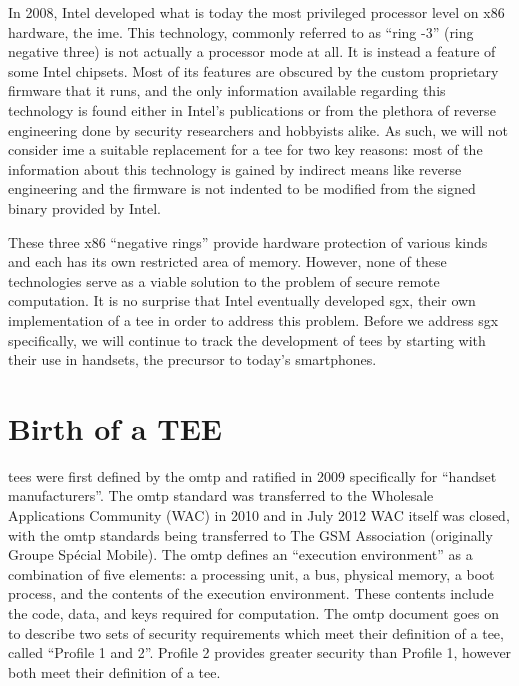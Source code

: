 In 2008, \cite{eldar2008configuring} Intel developed what is today the most privileged processor level on x86 hardware, the \gls{ime}. This technology, commonly referred to as ``ring -3'' (ring negative three) is not actually a processor mode at all. It is instead a feature of some Intel chipsets. Most of its features are obscured by the custom proprietary firmware that it runs, and the only information available regarding this technology is found either in Intel's publications or from the plethora of reverse engineering done by security researchers and hobbyists alike. As such, we will not consider \gls{ime} a suitable replacement for a \gls{tee} for two key reasons: most of the information about this technology is gained by indirect means like reverse engineering and the firmware is not indented to be modified from the signed binary provided by Intel. 

These three x86 ``negative rings'' provide hardware protection of various kinds and each has its own restricted area of memory. However, none of these technologies serve as a viable solution to the problem of secure remote computation. It is no surprise that Intel eventually developed \gls{sgx}, their own implementation of a \gls{tee} in order to address this problem. Before we address \gls{sgx} specifically, we will continue to track the development of \glspl{tee} by starting with their use in handsets, the precursor to today's smartphones.

\section{Birth of a TEE}

\glspl{tee} were first defined by the \gls{omtp} and ratified in 2009 \cite{Confidential2009} specifically for ``handset manufacturers''. The \gls{omtp} standard was transferred to the Wholesale Applications Community (WAC) in 2010 and in July 2012 WAC itself was closed, with the \gls{omtp} standards being transferred to The GSM Association (originally Groupe Sp\'ecial Mobile). \cite{WAC} The \gls{omtp} defines an ``execution environment'' as a combination of five elements: a processing unit, a bus, physical memory, a boot process, and the contents of the execution environment. \cite{Confidential2009} These contents include the code, data, and keys required for computation. The \gls{omtp} document goes on to describe two sets of security requirements which meet their definition of a \gls{tee}, called ``Profile 1 and 2''. Profile 2 provides greater security than Profile 1, however both meet their definition of a \gls{tee}.

